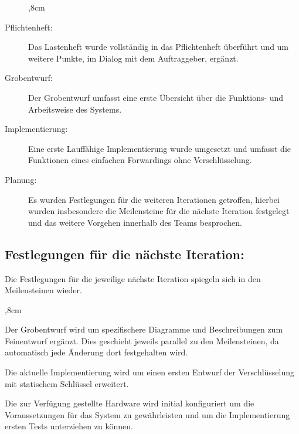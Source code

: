 \documentclass[a4paper, 11pt, ngerman, fleqn]{article}
\begin{document}
\begin{description}
	,8cm
		\item[Pflichtenheft:] Das Lastenheft wurde vollständig in das Pflichtenheft überführt und um weitere Punkte, im Dialog mit dem Auftraggeber, ergänzt.
		
		\item[Grobentwurf:] Der Grobentwurf umfasst eine erste Übersicht über die Funktions- und Arbeitsweise des Systems.
		
		\item[Implementierung:] Eine erste Lauffähige Implementierung wurde umgesetzt und umfasst die Funktionen eines einfachen Forwardings ohne Verschlüsselung.
		
		\item[Planung:] Es wurden Festlegungen für die weiteren Iterationen getroffen, hierbei wurden insbesondere die Meilensteine für die nächste Iteration festgelegt und das weitere Vorgehen innerhalb des Teams besprochen.
		
	\end{description}

\subsection{Festlegungen für die nächste Iteration:}
Die Festlegungen für die jeweilige nächste Iteration spiegeln sich in den Meilensteinen wieder.

\begin{description}
	,8cm
		\item[Grobentwurf verfeinern:] Der Grobentwurf wird um spezifischere Diagramme und Beschreibungen zum Feinentwurf ergänzt. Dies geschieht jeweils parallel zu den Meilensteinen, da automatisch jede Änderung dort festgehalten wird.
		
		\item[Implementierung erweitern:] Die aktuelle Implementierung wird um einen ersten Entwurf der Verschlüsselung mit statischem Schlüssel erweitert.
		
		\item[Hardware konfigurieren:] Die zur Verfügung gestellte Hardware wird initial konfiguriert um die Voraussetzungen für das System zu gewährleisten und um die Implementierung ersten Tests unterziehen zu können.
		
	\end{description}
  
\end{document}
